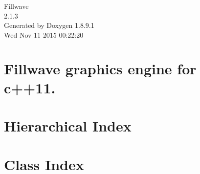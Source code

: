 \documentclass[twoside]{book}
\newcommand{\+}{\discretionary{\mbox{\scriptsize$\hookleftarrow$}}{}{}}
\newcommand{\clearemptydoublepage}{%
  \newpage{\pagestyle{empty}\cleardoublepage}%
}
\begin{document}
\hypersetup{pageanchor=false,
             bookmarks=true,
             bookmarksnumbered=true,
             pdfencoding=unicode
            }
\begin{titlepage}
\vspace*{7cm}
\begin{center}%
{\Large Fillwave \\[1ex]\large 2.\+1.\+3 }\\
\vspace*{1cm}
{\large Generated by Doxygen 1.8.9.1}\\
\vspace*{0.5cm}
{\small Wed Nov 11 2015 00:22:20}\\
\end{center}
\end{titlepage}
\clearemptydoublepage
\tableofcontents
\clearemptydoublepage
{}
\hypersetup{pageanchor=true}

\chapter{Fillwave graphics engine for c++11.}
\label{index}\hypertarget{index}{}
\chapter{Hierarchical Index}

\chapter{Class Index}

\end{document}
